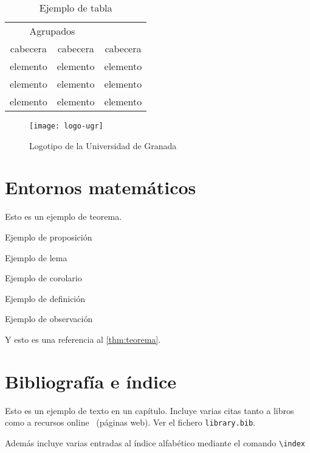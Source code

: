 \begin{table}[htpb]
  \centering
  \begin{tabular}{ccc} \toprule
    \multicolumn{2}{c}{Agrupados} \\ \cmidrule(r){1-2}
    cabecera & cabecera & cabecera          \\ \midrule
    elemento & elemento & elemento          \\ 
    elemento & elemento & elemento          \\ 
    elemento & elemento & elemento          \\ \bottomrule
  \end{tabular}
  \caption{Ejemplo de tabla}
  \label{tb:ejemplo-tabla}
\end{table}

\begin{figure}[htpb]
  \centering
  \texttt{[image: logo-ugr]}
  \caption{Logotipo de la Universidad de Granada}
  \label{fig:logo-ugr}
\end{figure}

\section{Entornos matemáticos}

\begin{teorema}\label{thm:teorema}
Esto es un ejemplo de teorema.
\end{teorema}

\begin{proposicion}
Ejemplo de proposición
\end{proposicion}

\begin{lema}
Ejemplo de lema
\end{lema}

\begin{corolario}
Ejemplo de corolario
\end{corolario}

\begin{definicion}
Ejemplo de definición
\end{definicion}

\begin{observacion}
Ejemplo de observación
\end{observacion}

Y esto es una referencia al \autoref{thm:teorema}. 


\section{Bibliografía e índice}

Esto es un ejemplo de texto en un capítulo. Incluye varias citas tanto a libros~\cite{Euler1982, Euler1984, Euler1985} como a recursos online~\cite{EulerWiki} (páginas web). Ver el fichero \texttt{library.bib}. 

Además incluye varias entradas al índice alfabético mediante el comando \verb+\index+ 


\endinput
